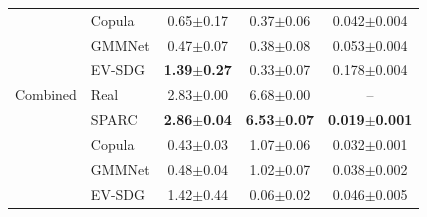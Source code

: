 \begin{table}[t]
\begin{tabular}{llccc}
 & Copula & 0.65$\pm$0.17 & 0.37$\pm$0.06 & 0.042$\pm$0.004 \\
 & GMMNet & 0.47$\pm$0.07 & 0.38$\pm$0.08 & 0.053$\pm$0.004 \\
 & EV-SDG & \textbf{1.39$\pm$0.27} & 0.33$\pm$0.07 & 0.178$\pm$0.004 \\
\midrule
Combined & Real & 2.83$\pm$0.00 & 6.68$\pm$0.00 & -- \\
 & SPARC & \textbf{2.86$\pm$0.04} & \textbf{6.53$\pm$0.07} & \textbf{0.019$\pm$0.001} \\
 & Copula & 0.43$\pm$0.03 & 1.07$\pm$0.06 & 0.032$\pm$0.001 \\
 & GMMNet & 0.48$\pm$0.04 & 1.02$\pm$0.07 & 0.038$\pm$0.002 \\
 & EV-SDG & 1.42$\pm$0.44 & 0.06$\pm$0.02 & 0.046$\pm$0.005 \\
\bottomrule
\end{tabular}
\end{table}
